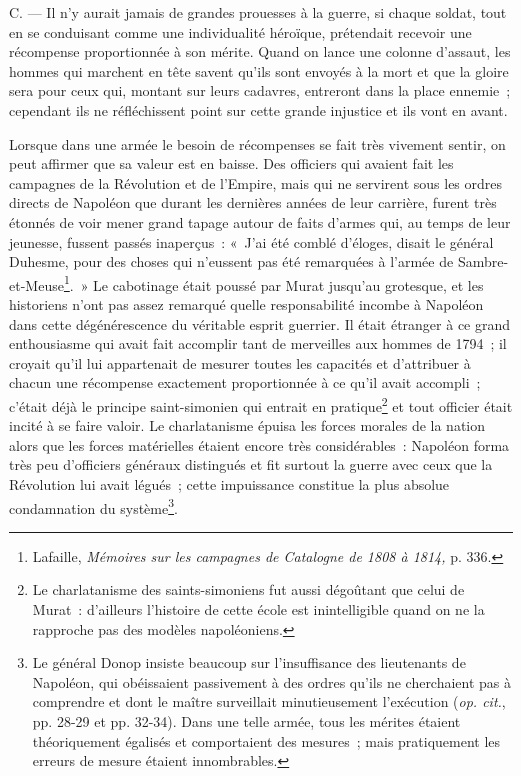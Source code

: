 \documentclass[french,twoside]{book} %
\begin{document}
\noindent C. — Il n’y aurait jamais de grandes prouesses à la guerre, si chaque soldat, tout en se conduisant comme une individualité héroïque, prétendait recevoir une récompense proportionnée à son mérite. Quand on lance une colonne d’assaut, les hommes qui marchent en tête savent qu’ils sont envoyés à la mort et que la gloire sera pour ceux qui, montant sur leurs cadavres, entreront dans la place ennemie ; cependant ils ne réfléchissent point sur cette grande injustice et ils vont en avant.\par
Lorsque dans une armée le besoin de récompenses se fait très vivement sentir, on peut affirmer que sa valeur est en baisse. Des officiers qui avaient fait les campagnes de la Révolution et de l’Empire, mais qui ne servirent sous les ordres directs de Napoléon que durant les dernières années de leur carrière, furent très étonnés de voir mener grand tapage autour de faits d’armes qui, au temps de leur jeunesse, fussent passés inaperçus : « J’ai été comblé d’éloges, disait le général Duhesme, pour des choses qui n’eussent pas été remarquées à l’armée de Sambre-et-Meuse\footnote{ \noindent Lafaille, \emph{Mémoires sur les campagnes de Catalogne de 1808 à 1814,} p. 336.
 }. » Le cabotinage était poussé par Murat jusqu’au grotesque, et les historiens n’ont pas assez remarqué quelle responsabilité  incombe à Napoléon dans cette dégénérescence du véritable esprit guerrier. Il était étranger à ce grand enthousiasme qui avait fait accomplir tant de merveilles aux hommes de 1794 ; il croyait qu’il lui appartenait de mesurer toutes les capacités et d’attribuer à chacun une récompense exactement proportionnée à ce qu’il avait accompli ; c’était déjà le principe saint-simonien qui entrait en pratique\footnote{ \noindent Le charlatanisme des saints-simoniens fut aussi dégoûtant que celui de Murat : d’ailleurs l’histoire de cette école est inintelligible quand on ne la rapproche pas des modèles napoléoniens.
 } et tout officier était incité à se faire valoir. Le charlatanisme épuisa les forces morales de la nation alors que les forces matérielles étaient encore très considérables : Napoléon forma très peu d’officiers généraux distingués et fit surtout la guerre avec ceux que la Révolution lui avait légués ; cette impuissance constitue la plus absolue condamnation du système\footnote{ \noindent Le général Donop insiste beaucoup sur l’insuffisance des lieutenants de Napoléon, qui obéissaient passivement à des ordres qu’ils ne cherchaient pas à comprendre et dont le maître surveillait minutieusement l’exécution (\emph{op. cit.}, pp. 28-29 et pp. 32-34). Dans une telle armée, tous les mérites étaient théoriquement égalisés et comportaient des mesures ; mais pratiquement les erreurs de mesure étaient innombrables.
 }.\par
\end{document}
